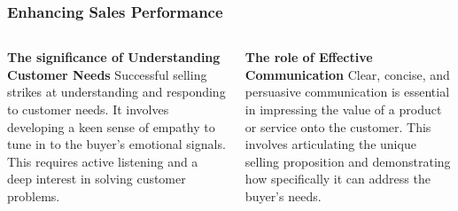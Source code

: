 \documentclass[5pt]{beamer}
\begin{document}
\begin{frame}
\frametitle{Enhancing Sales Performance}
\begin{columns}
\begin{column}{0.45\textwidth}
\begin{block}{\textbf{The significance of Understanding Customer Needs}}
Successful selling strikes at understanding and responding to customer needs. It involves developing a keen sense of empathy to tune in to the buyer's emotional signals. This requires active listening and a deep interest in solving customer problems.
\end{block}
\end{column}
\begin{column}{0.45\textwidth}
\begin{block}{\textbf{The role of Effective Communication}}
Clear, concise, and persuasive communication is essential in impressing the value of a product or service onto the customer. This involves articulating the unique selling proposition and demonstrating how specifically it can address the buyer's needs.
\end{block}
\end{column}
\end{columns}
\end{frame}
\end{document}
